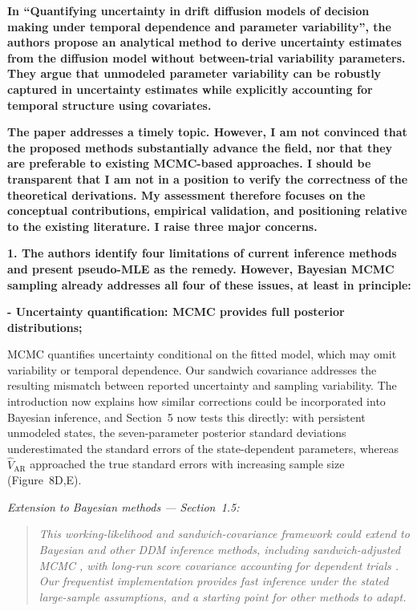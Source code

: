 \documentclass[00-main.tex]{subfiles}
\newcommand{\reviewercomment}[1]{\vspace{0.3cm}\textbf{#1}\vspace{0.15cm}}
\newcommand{\manuscriptquote}[1]{\begin{quote}\textit{#1}\end{quote}}
\begin{document}
\reviewercomment{In ``Quantifying uncertainty in drift diffusion models of decision making under temporal dependence and parameter variability'', the authors propose an analytical method to derive uncertainty estimates from the diffusion model without between-trial variability parameters. They argue that unmodeled parameter variability can be robustly captured in uncertainty estimates while explicitly accounting for temporal structure using covariates.}

\reviewercomment{The paper addresses a timely topic. However, I am not convinced that the proposed methods substantially advance the field, nor that they are preferable to existing MCMC-based approaches.
I should be transparent that I am not in a position to verify the correctness of the theoretical derivations. My assessment therefore focuses on the conceptual contributions, empirical validation, and positioning relative to the existing literature. I raise three major concerns.}

\reviewercomment{1. The authors identify four limitations of current inference methods and present pseudo-MLE as the remedy. However, Bayesian MCMC sampling already addresses all four of these issues, at least in principle:}

\reviewercomment{- Uncertainty quantification: MCMC provides full posterior distributions;}

MCMC quantifies uncertainty conditional on the fitted model, which may omit variability or temporal dependence. Our sandwich covariance addresses the resulting mismatch between reported uncertainty and sampling variability. The introduction now explains how similar corrections could be incorporated into Bayesian inference, and Section~5 now tests this directly: with persistent unmodeled states, the seven-parameter posterior standard deviations underestimated the standard errors of the state-dependent parameters, whereas $\widehat{V}_\text{AR}$ approached the true standard errors with increasing sample size (Figure~8D,E).

\emph{Extension to Bayesian methods --- Section~1.5:}

\manuscriptquote{This working-likelihood and sandwich-covariance framework could extend to Bayesian and other DDM inference methods, including sandwich-adjusted MCMC \citep{shaby_open-faced_2014}, with long-run score covariance accounting for dependent trials \citep{newey_simple_1987}. Our frequentist implementation provides fast inference under the stated large-sample assumptions, and a starting point for other methods to adapt.}
\end{document}
